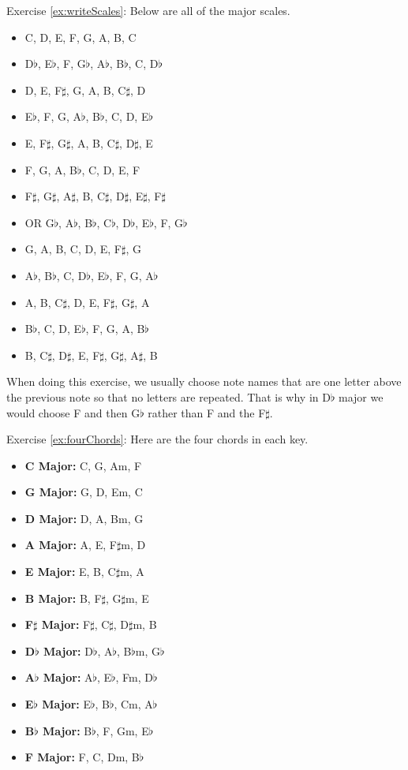 \documentclass[12pt]{article}
\theoremstyle{definition}
\begin{document}
Exercise \ref{ex:writeScales}: Below are all of the major scales.
\begin{itemize}
\item C, D, E, F, G, A, B, C
\item D$\flat$, E$\flat$, F, G$\flat$, A$\flat$, B$\flat$, C, D$\flat$
\item D, E, F$\sharp$, G, A, B, C$\sharp$, D
\item E$\flat$, F, G, A$\flat$, B$\flat$, C, D, E$\flat$
\item E, F$\sharp$, G$\sharp$, A, B, C$\sharp$, D$\sharp$, E
\item F, G, A, B$\flat$, C, D, E, F
\item F$\sharp$, G$\sharp$, A$\sharp$, B, C$\sharp$, D$\sharp$, E$\sharp$, F$\sharp$
\item OR G$\flat$, A$\flat$, B$\flat$, C$\flat$, D$\flat$, E$\flat$, F, G$\flat$
\item G, A, B, C, D, E, F$\sharp$, G
\item A$\flat$, B$\flat$, C, D$\flat$, E$\flat$, F, G, A$\flat$
\item A, B, C$\sharp$, D, E, F$\sharp$, G$\sharp$, A
\item B$\flat$, C, D, E$\flat$, F, G, A, B$\flat$
\item B, C$\sharp$, D$\sharp$, E, F$\sharp$, G$\sharp$, A$\sharp$, B
\end{itemize}
When doing this exercise, we usually choose note names that are one letter above the previous note so that no letters are repeated. That is why in D$\flat$ major we would choose F and then G$\flat$ rather than F and the F$\sharp$. 

Exercise \ref{ex:fourChords}: Here are the four chords in each key. 
\begin{itemize}
    \item \textbf{C Major:} C, G, Am, F
    \item \textbf{G Major:} G, D, Em, C
    \item \textbf{D Major:} D, A, Bm, G
    \item \textbf{A Major:} A, E, F$\sharp$m, D
    \item \textbf{E Major:} E, B, C$\sharp$m, A
    \item \textbf{B Major:} B, F$\sharp$, G$\sharp$m, E
    \item \textbf{F$\sharp$ Major:} F$\sharp$, C$\sharp$, D$\sharp$m, B
    \item \textbf{D$\flat$ Major:} D$\flat$, A$\flat$, B$\flat$m, G$\flat$
    \item \textbf{A$\flat$ Major:} A$\flat$, E$\flat$, Fm, D$\flat$
    \item \textbf{E$\flat$ Major:} E$\flat$, B$\flat$, Cm, A$\flat$
    \item \textbf{B$\flat$ Major:} B$\flat$, F, Gm, E$\flat$
    \item \textbf{F Major:} F, C, Dm, B$\flat$
\end{itemize}
\end{document}
